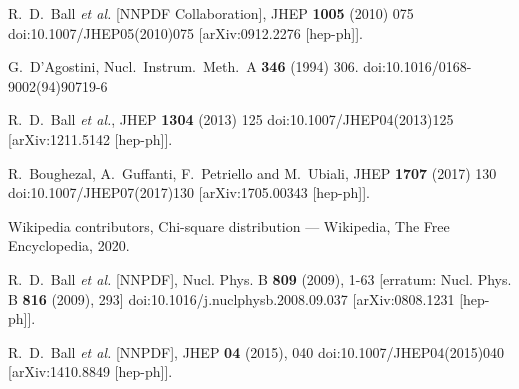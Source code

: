 \documentclass[10pt,a4paper]{article}
\begin{document}
\begin{thebibliography}{alp}

  R.~D.~Ball {\it et al.} [NNPDF Collaboration],
  JHEP {\bf 1005} (2010) 075
  doi:10.1007/JHEP05(2010)075
  [arXiv:0912.2276 [hep-ph]].

  G.~D'Agostini,
  Nucl.\ Instrum.\ Meth.\ A {\bf 346} (1994) 306.
  doi:10.1016/0168-9002(94)90719-6

  R.~D.~Ball {\it et al.},
  JHEP {\bf 1304} (2013) 125
  doi:10.1007/JHEP04(2013)125
  [arXiv:1211.5142 [hep-ph]].

  R.~Boughezal, A.~Guffanti, F.~Petriello and M.~Ubiali,
  JHEP {\bf 1707} (2017) 130
  doi:10.1007/JHEP07(2017)130
  [arXiv:1705.00343 [hep-ph]].

    Wikipedia contributors,
    Chi-square distribution --- {Wikipedia}{,} The Free Encyclopedia,
    2020.

R.~D.~Ball \textit{et al.} [NNPDF],
Nucl. Phys. B \textbf{809} (2009), 1-63
[erratum: Nucl. Phys. B \textbf{816} (2009), 293]
doi:10.1016/j.nuclphysb.2008.09.037
[arXiv:0808.1231 [hep-ph]].

R.~D.~Ball \textit{et al.} [NNPDF],
JHEP \textbf{04} (2015), 040
doi:10.1007/JHEP04(2015)040
[arXiv:1410.8849 [hep-ph]].

\end{thebibliography}
\end{document}
